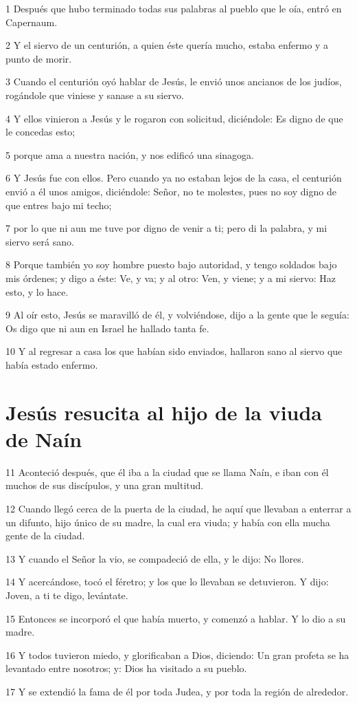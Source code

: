 \par 1 Después que hubo terminado todas sus palabras al pueblo que le oía, entró en Capernaum.
\par 2 Y el siervo de un centurión, a quien éste quería mucho, estaba enfermo y a punto de morir.
\par 3 Cuando el centurión oyó hablar de Jesús, le envió unos ancianos de los judíos, rogándole que viniese y sanase a su siervo.
\par 4 Y ellos vinieron a Jesús y le rogaron con solicitud, diciéndole: Es digno de que le concedas esto;
\par 5 porque ama a nuestra nación, y nos edificó una sinagoga.
\par 6 Y Jesús fue con ellos. Pero cuando ya no estaban lejos de la casa, el centurión envió a él unos amigos, diciéndole: Señor, no te molestes, pues no soy digno de que entres bajo mi techo;
\par 7 por lo que ni aun me tuve por digno de venir a ti; pero di la palabra, y mi siervo será sano.
\par 8 Porque también yo soy hombre puesto bajo autoridad, y tengo soldados bajo mis órdenes; y digo a éste: Ve, y va; y al otro: Ven, y viene; y a mi siervo: Haz esto, y lo hace.
\par 9 Al oír esto, Jesús se maravilló de él, y volviéndose, dijo a la gente que le seguía: Os digo que ni aun en Israel he hallado tanta fe.
\par 10 Y al regresar a casa los que habían sido enviados, hallaron sano al siervo que había estado enfermo.

\section*{Jesús resucita al hijo de la viuda de Naín}

\par 11 Aconteció después, que él iba a la ciudad que se llama Naín, e iban con él muchos de sus discípulos, y una gran multitud.
\par 12 Cuando llegó cerca de la puerta de la ciudad, he aquí que llevaban a enterrar a un difunto, hijo único de su madre, la cual era viuda; y había con ella mucha gente de la ciudad.
\par 13 Y cuando el Señor la vio, se compadeció de ella, y le dijo: No llores.
\par 14 Y acercándose, tocó el féretro; y los que lo llevaban se detuvieron. Y dijo: Joven, a ti te digo, levántate.
\par 15 Entonces se incorporó el que había muerto, y comenzó a hablar. Y lo dio a su madre.
\par 16 Y todos tuvieron miedo, y glorificaban a Dios, diciendo: Un gran profeta se ha levantado entre nosotros; y: Dios ha visitado a su pueblo.
\par 17 Y se extendió la fama de él por toda Judea, y por toda la región de alrededor.

